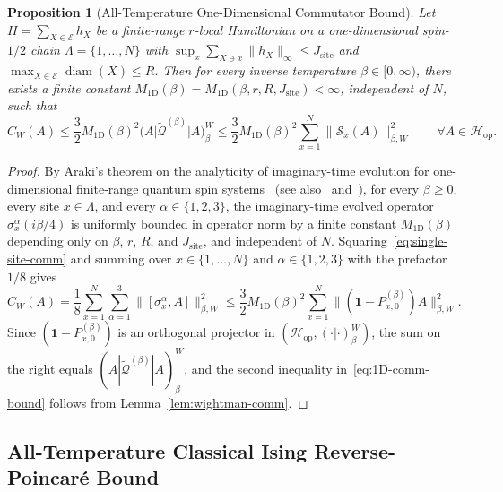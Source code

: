 \documentclass[11pt,a4paper]{article}
\numberwithin{equation}{section}
\theoremstyle{plain}
\newtheorem{proposition}[theorem]{Proposition}
\theoremstyle{definition}
\newcommand{\Hop}{\mathcal{H}_{\mathrm{op}}}
\newcommand{\diam}{\operatorname{diam}}
\begin{document}
\begin{proposition}[All-Temperature One-Dimensional Commutator Bound]\label{prop:1D}
Let $H = \sum_{X\in\mathcal{E}} h_X$ be a finite-range $r$-local Hamiltonian on a one-dimensional spin-$1/2$ chain $\Lambda = \{1,\dots,N\}$ with $\sup_x\sum_{X\ni x}\|h_X\|_\infty \le J_{\mathrm{site}}$ and $\max_{X\in\mathcal{E}}\diam(X) \le R$. Then for every inverse temperature $\beta\in[0,\infty)$, there exists a finite constant $M_{1\mathrm{D}}(\beta) = M_{1\mathrm{D}}(\beta, r, R, J_{\mathrm{site}}) < \infty$, independent of $N$, such that
\begin{equation}\label{eq:1D-comm-bound}
  C_W(A) \le \frac{3}{2} M_{1\mathrm{D}}(\beta)^2 \bigl(A\big|\widetilde{\mathcal{Q}}^{(\beta)}\big|A\bigr)_\beta^W
  \le \frac{3}{2} M_{1\mathrm{D}}(\beta)^2 \sum_{x=1}^N \|\mathcal{S}_x(A)\|_{\beta,W}^2 \qquad \forall A\in\Hop.
\end{equation}
\end{proposition}

\begin{proof}
By Araki's theorem on the analyticity of imaginary-time evolution for one-dimensional finite-range quantum spin systems~\cite{Araki1969} (see also~\cite[Sec.~6.2]{Bratteli1997} and~\cite{Bluhm2025}), for every $\beta\ge 0$, every site $x\in\Lambda$, and every $\alpha\in\{1,2,3\}$, the imaginary-time evolved operator $\sigma_x^\alpha(i\beta/4)$ is uniformly bounded in operator norm by a finite constant $M_{1\mathrm{D}}(\beta)$ depending only on $\beta$, $r$, $R$, and $J_{\mathrm{site}}$, and independent of $N$. Squaring~\eqref{eq:single-site-comm} and summing over $x\in\{1,\dots,N\}$ and $\alpha\in\{1,2,3\}$ with the prefactor $1/8$ gives
\[
  C_W(A) = \frac{1}{8}\sum_{x=1}^N\sum_{\alpha=1}^3 \bigl\|[\sigma_x^\alpha, A]\bigr\|_{\beta,W}^2
  \le \frac{3}{2} M_{1\mathrm{D}}(\beta)^2 \sum_{x=1}^N \bigl\|(\mathbf{1}-P_{x,0}^{(\beta)})A\bigr\|_{\beta,W}^2.
\]
Since $(\mathbf{1}-P_{x,0}^{(\beta)})$ is an orthogonal projector in $(\Hop,(\cdot|\cdot)_\beta^W)$, the sum on the right equals $(A|\widetilde{\mathcal{Q}}^{(\beta)}|A)_\beta^W$, and the second inequality in~\eqref{eq:1D-comm-bound} follows from Lemma~\ref{lem:wightman-comm}.
\end{proof}

\subsection{All-Temperature Classical Ising Reverse-Poincar\'e Bound}\label{subsec:classical-ising}
\end{document}
